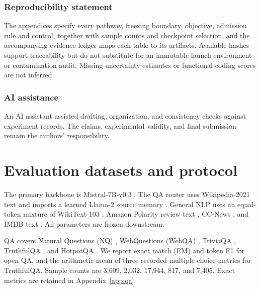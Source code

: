 \documentclass{article}
\begin{document}
\subsubsection*{Reproducibility statement}
The appendices specify every pathway, freezing boundary, objective, admission rule and control, together with sample counts and checkpoint selection, and the accompanying evidence ledger maps each table to its artifacts. Available hashes support traceability but do not substitute for an immutable launch environment or contamination audit. Missing uncertainty estimates or functional coding scores are not inferred.

\subsubsection*{AI assistance}
An AI assistant assisted drafting, organization, and consistency checks against experiment records. The claims, experimental validity, and final submission remain the authors' responsibility.



\clearpage
\appendix

\section{Evaluation datasets and protocol}\label{app:setup}

The primary backbone is Mistral-7B-v0.3 \citep{jiang2023mistral}. The QA router uses Wikipedia-2021 text and imports a learned Llama-2 source memory \citep{touvron2023llama}. General NLP uses an equal-token mixture of WikiText-103 \citep{merity2017pointer}, Amazon Polarity review text \citep{zhang2015character}, CC-News \citep{blagojevic2021ccnews}, and IMDB text \citep{maas2011learning}. All parameters are frozen downstream.

QA covers Natural Questions (NQ) \citep{kwiatkowski2019natural}, WebQuestions (WebQA) \citep{berant2013semantic}, TriviaQA \citep{joshi2017trivia}, TruthfulQA \citep{lin2022truthful}, and HotpotQA \citep{yang2018hotpot}. We report exact match (EM) and token F1 for open QA, and the arithmetic mean of three recorded multiple-choice metrics for TruthfulQA. Sample counts are 3,609, 2,032, 17,944, 817, and 7,405. Exact metrics are retained in Appendix~\ref{app:qa}.
\end{document}
